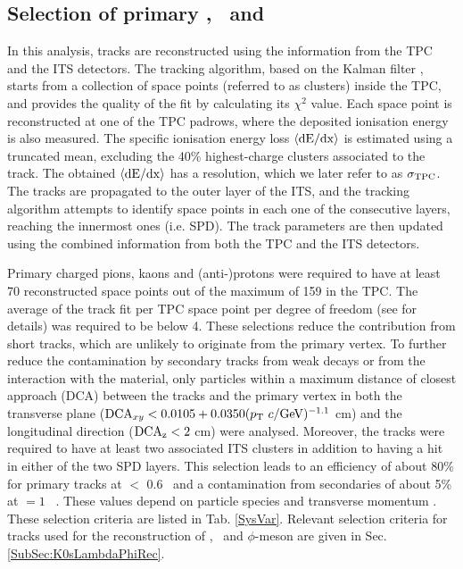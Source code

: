 \documentclass[ALICE,manyauthors]{cernphprep}
\begin{document}

\subsection{Selection of primary \pion, \kaon~and \proton}
\label{SubSec:Track}
In this analysis, tracks are reconstructed using the information from the TPC and the ITS detectors. The tracking algorithm, based on the Kalman filter \cite{Billoir:1983mz,Billoir:1985nq}, starts from a collection of space points (referred to as clusters) inside the TPC, and provides the quality of the fit by calculating its $\chi^{2}$ value. Each space point is reconstructed at one of the TPC padrows, where the deposited ionisation energy is also measured. The specific ionisation energy loss $\langle{\rm{dE}/dx}\rangle$ is estimated using a truncated mean, excluding the 40\% highest-charge clusters associated to the track. The obtained $\langle{\rm{dE}/dx}\rangle$ has a resolution, which we later refer to as $\sigma_{\rm{TPC}}$. The tracks are propagated to the outer layer of the ITS, and the tracking algorithm attempts to identify space points in each one of the consecutive layers, reaching the innermost ones (i.e. SPD). The track parameters are then updated using the combined information from both the TPC and the ITS detectors. 

Primary charged pions, kaons and (anti-)protons were required to have at least 70 reconstructed space points out of the maximum of 159 in the TPC. The average of the track fit per TPC space point per degree of freedom (see \cite{Abelev:2014ffa} for details) was required to be below 4. These selections reduce the contribution from short tracks, which are unlikely to originate from the primary vertex. To further reduce the contamination by secondary tracks from weak decays or from the interaction with the material, only particles within a maximum distance of closest approach (DCA) between the tracks and the primary vertex in both the transverse plane (${\rm{DCA}}_{xy} < 0.0105 + 0.0350(p_{\rm{T}}~c/{\rm{GeV}})^{-1.1}$ cm) and the longitudinal direction ($\rm{DCA}_{z} < 2$ cm) were analysed. Moreover, the tracks were required to have at least two associated ITS clusters in addition to having a hit in either of the two SPD layers. This selection leads to an efficiency of about 80\% for primary tracks at \pT$ < $ 0.6 \GeV~and a contamination from secondaries of about 5\% at \pT $= 1$ \GeV~\cite{Abelev:2013vea}. These values depend on particle species and transverse momentum \cite{Abelev:2013vea}. These selection criteria are listed in Tab. \ref{SysVar}. Relevant selection criteria for tracks used for the reconstruction of \Ks, \lambdas~and $\phi$-meson are given in Sec. \ref{SubSec:K0sLambdaPhiRec}.
\end{document}
